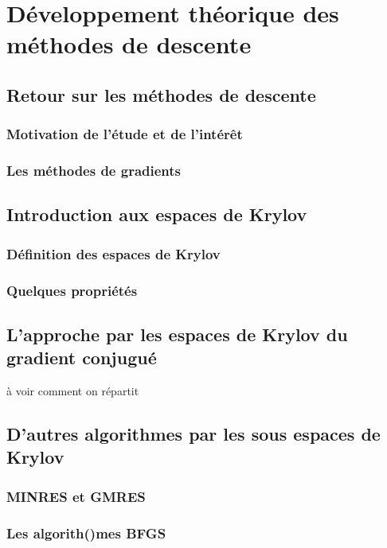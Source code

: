 \chapter{Développement théorique des méthodes de descente}
\section{Retour sur les méthodes de descente}
\subsection{Motivation de l'étude et de l'intérêt}
\subsection{Les méthodes de gradients}

\section{Introduction aux espaces de Krylov}
\subsection{Définition des espaces de Krylov}
\subsection{Quelques propriétés}

\section{L'approche par les espaces de Krylov du gradient conjugué}
à voir comment on répartit

\section{D'autres algorithmes par les sous espaces de Krylov}
\subsection{MINRES et GMRES}
\subsection{Les algorith()mes BFGS}